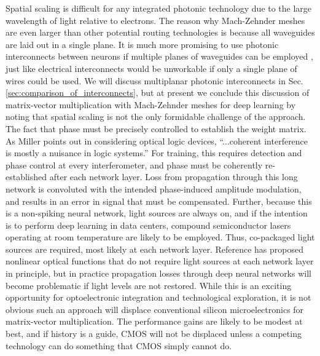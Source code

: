 Spatial scaling is difficult for any integrated photonic technology due to the large wavelength of light relative to electrons. The reason why Mach-Zehnder meshes are even larger than other potential routing technologies is because all waveguides are laid out in a single plane. It is much more promising to use photonic interconnects between neurons if multiple planes of waveguides can be employed \cite{chbu2017,chbu2018,sami2017}, just like electrical interconnects would be unworkable if only a single plane of wires could be used. We will discuss multiplanar photonic interconnects in Sec.\,\ref{sec:comparison_of_interconnects}, but at present we conclude this discussion of matrix-vector multiplication with Mach-Zehnder meshes for deep learning by noting that spatial scaling is not the only formidable challenge of the approach. The fact that phase must be precisely controlled to establish the weight matrix. As Miller points out in considering optical logic devices, ``...coherent interference is mostly a nuisance in logic systems.'' \cite{mi2010} For training, this requires detection and phase control at every interferometer, and phase must be coherently re-established after each network layer. Loss from propagation through this long network is convoluted with the intended phase-induced amplitude modulation, and results in an error in signal that must be compensated. Further, because this is a non-spiking neural network, light sources are always on, and if the intention is to perform deep learning in data centers, compound semiconductor lasers operating at room temperature are likely to be employed. Thus, co-packaged light sources are required, most likely at each network layer. Reference \cite{wihu2019} has proposed nonlinear optical functions that do not require light sources at each network layer in principle, but in practice propagation losses through deep neural networks will become problematic if light levels are not restored. While this is an exciting opportunity for optoelectronic integration and technological exploration, it is not obvious such an approach will displace conventional silicon microelectronics for matrix-vector multiplication. The performance gains are likely to be modest at best, and if history is a guide, CMOS will not be displaced unless a competing technology can do something that CMOS simply cannot do.

